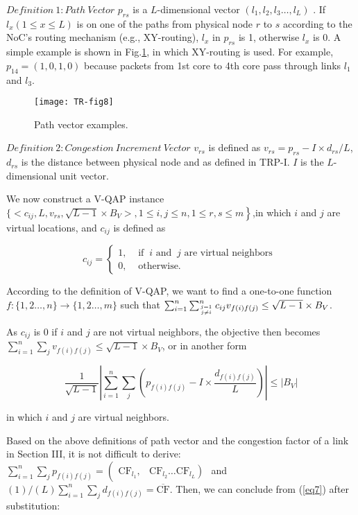 $Definition\ 1: Path\ Vector$ $p_{r s}$ is a $L$-dimensional vector $\left(l_{1}, l_{2}, l_{3} \ldots, l_{L}\right)$ . If $l_{x}(1 \leq x \leq L)$ is on one of the paths from physical node $r$ to $s$ according to the NoC’s routing mechanism (e.g., XY-routing), $l_{x}$ in $p_{r s}$ is 1, otherwise $l_{x}$ is 0. A simple example is shown in Fig.\ref{fig8}, in which XY-routing is used. For example, $p_{14}=(1,0,1,0)$ because packets from 1st core to 4th core pass through links  $l_{1}$ and $l_{3}$.

\begin{figure}[t]
    \centering
    \texttt{[image: TR-fig8]}
    \caption{Path vector examples.}
    \label{fig8}
\end{figure}

$Definition\ 2: Congestion\ Increment\ Vector$ $v_{r s}$ is defined as $v_{rs}=p_{rs}-I \times d_{rs} / L $, $ d_{rs}$ is the distance between physical node and as defined in TRP-I. $I$ is the $L$-dimensional unit vector.

We now construct a V-QAP instance $\{<\left.c_{i j}, L, v_{r s}, \sqrt{L-1} \times B_{V}>, 1 \leq i, j \leq n, 1 \leq r, s \leq m\right\}$,in which $i$ and $j$ are virtual locations, and $c_{ij}$ is defined as 

$$c_{i j}= \left\{
    \begin{array}{ll}
        1, & \text { if }\ i \text {\ and }\ j \text {\ are\ virtual\ neighbors } \\ 
        0, & \text { otherwise. }
    \end{array} \right. $$

According to the definition of V-QAP, we want to find a one-to-one function $f:\{1,2 \ldots, n\} \rightarrow\{1,2 \ldots, m\}$  such that $\sum_{i=1}^{n} \sum_{j=1 \atop j \neq i}^{n} c_{i j} v_{f(i) f(j)} \leq \sqrt{L-1} \times B_{V}$.

As $c_{i j}$ is 0 if $i$  and $j$ are not virtual neighbors, the objective then becomes $\sum_{i=1}^{n} \sum_{j} v_{f(i) f(j)} \leq \sqrt{L-1} \times B_{V}$, or in another form 

\begin{equation}
    \frac{1}{\sqrt{L-1}}\left|\sum_{i=1}^{n} \sum_{j}\left(p_{f(i) f(j)}-I \times \frac{d_{f(i) f(j)}}{L}\right)\right| \leq\left|B_{V}\right|
    \label{eq7}
\end{equation}

in which $i$ and $j$ are virtual neighbors.

Based on the above definitions of path vector and the congestion factor of a link in Section III, it is not difficult to derive:
$\sum_{i=1}^{n} \sum_{j} p_{f(i) f(j)}=\left(\begin{array}{ll}\mathrm{CF}_{l_{1}}, & \left.\mathrm{CF}_{l_{2}} \ldots \mathrm{CF}_{l_{L}}\right)\end{array}\right.$ and $(1) /(L) \sum_{i=1}^{n} \sum_{j} d_{f(i) f(j)}=\overline{\mathrm{CF}}$. Then, we can conclude from (\ref{eq7}) after substitution:

